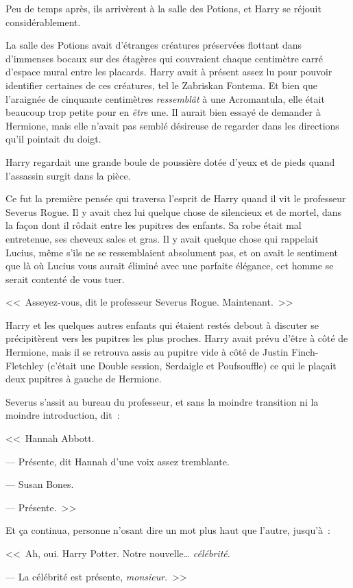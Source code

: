 Peu de temps après, ils arrivèrent à la salle des Potions, et Harry se réjouit considérablement.

La salle des Potions avait d'étranges créatures préservées flottant dans d'immenses bocaux sur des étagères qui couvraient chaque centimètre carré d'espace mural entre les placards. Harry avait à présent assez lu pour pouvoir identifier certaines de ces créatures, tel le Zabriskan Fontema. Et bien que l'araignée de cinquante centimètres \emph{ressemblât} à une Acromantula, elle était beaucoup trop petite pour en \emph{être} une. Il aurait bien essayé de demander à Hermione, mais elle n'avait pas semblé désireuse de regarder dans les directions qu'il pointait du doigt.

Harry regardait une grande boule de poussière dotée d'yeux et de pieds quand l'assassin surgit dans la pièce.

Ce fut la première pensée qui traversa l'esprit de Harry quand il vit le professeur Severus Rogue. Il y avait chez lui quelque chose de silencieux et de mortel, dans la façon dont il rôdait entre les pupitres des enfants. Sa robe était mal entretenue, ses cheveux sales et gras. Il y avait quelque chose qui rappelait Lucius, même s'ils ne se ressemblaient absolument pas, et on avait le sentiment que là où Lucius vous aurait éliminé avec une parfaite élégance, cet homme se serait contenté de vous tuer.

<<~Asseyez-vous, dit le professeur Severus Rogue. Maintenant.~>>

Harry et les quelques autres enfants qui étaient restés debout à discuter se précipitèrent vers les pupitres les plus proches. Harry avait prévu d'être à côté de Hermione, mais il se retrouva assis au pupitre vide à côté de Justin Finch-Fletchley (c'était une Double session, Serdaigle et Poufsouffle) ce qui le plaçait deux pupitres à gauche de Hermione.

Severus s'assit au bureau du professeur, et sans la moindre transition ni la moindre introduction, dit~:

<<~Hannah Abbott.

--- Présente, dit Hannah d'une voix assez tremblante.

--- Susan Bones.

--- Présente.~>>

Et ça continua, personne n'osant dire un mot plus haut que l'autre, jusqu'à~:

<<~Ah, oui. Harry Potter. Notre nouvelle… \emph{célébrité}.

--- La célébrité est présente, \emph{monsieur}.~>>

